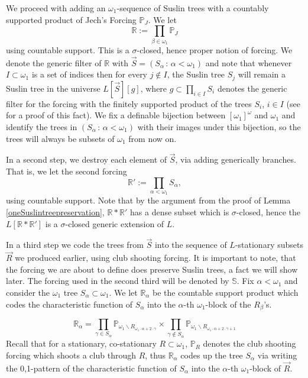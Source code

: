 \documentclass[a4paper,11pt]{article}
\newcommand{\forceP}{\mathbb{P}}
\newcommand{\forceR}{\mathbb{R}}
\begin{document}
We proceed with adding an $\omega_1$-sequence of Suslin trees with a countably supported product of Jech's Forcing $ \forceP_J$. We let 
\[\forceR := \prod_{\beta \in \omega_1} \forceP_J \] using countable support. This is a $\sigma$-closed, hence proper notion of forcing. We denote the generic filter of $\forceR$ with $\vec{S}=(S_{\alpha} \, : \, \alpha < \omega_1)$ and note that whenever $I \subset \omega_1$ is a set of indices then for every $j \notin I$, the Suslin tree $S_j$ will remain a Suslin tree in the universe $L[\vec{S}][g]$, where $g \subset \prod_{i \in I} S_i$ denotes the generic filter for the forcing with the finitely supported product of the trees $S_i$, $i \in I$ (see \cite{Ho} for a proof of this fact). We fix a definable bijection between $[\omega_1]^{\omega}$ and $\omega_1$ and identify the trees in $(S_{\alpha }\, : \, \alpha < \omega_1)$ with their images under this bijection, so the trees will always be subsets of $\omega_1$ from now on. 

In a second step, we destroy each element of $\vec{S}$, via adding generically branches. That is, we let the second forcing
\[ \forceR':= \prod_{\alpha < \omega_1}  S_{\alpha}, \]
using countable support. Note that by the argument from the proof of Lemma \ref{oneSuslintreepreservation}, $\forceR \ast \forceR'$ has a dense subset which is $\sigma$-closed, hence the $L[\forceR \ast \forceR']$ is a $\sigma$-closed generic extension of $L$.


In a third step we code the trees from $\vec{S}$ into the  sequence of $L$-stationary subsets $\vec{R}$ we produced earlier, using club shooting forcing. It is important to note, that the forcing we are about to define does preserve Suslin trees, a fact we will show later.
The forcing used in the second third will be denoted by $\mathbb{S}$. Fix $\alpha< \omega_1$ and consider the $\omega_1$ tree $S_{\alpha} \subset \omega_1$. We let $\forceR_{\alpha}$ be the countable support product which codes the characteristic function of $S_{\alpha}$ into the $\alpha$-th $\omega_1$-block of the $R_{\beta}$'s. 

$$\forceR_{\alpha} = \prod_{\gamma \in S_{\alpha}} \forceP_{\omega_1 \backslash R_{\omega_1 \cdot \alpha + 2 \cdot \gamma}} \times \prod_{\gamma \notin S_{\alpha}} \forceP_{\omega_1 \backslash R_{\omega_1 \cdot \alpha  + 2 \cdot \gamma +1}} $$ 
Recall that for a stationary, co-stationary $R \subset \omega_1$, $\forceP_{R}$ denotes the club shooting forcing which shoots a club through $R$, thus $\forceR_{\alpha}$ codes up the tree $S_{\alpha}$ via writing the 0,1-pattern of the characteristic function of $S_{\alpha}$ into the $\alpha$-th $\omega_1$-block of $\vec{R}$.
\end{document}
